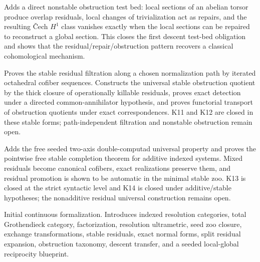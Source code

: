 \documentclass[11pt]{article}
\theoremstyle{definition}
\theoremstyle{remark}
\begin{document}
\begin{description}[leftmargin=8em,style=nextline]
\item[v0.4.0] Adds a direct nonstable obstruction test bed: local sections of an abelian torsor produce overlap residuals, local changes of trivialization act as repairs, and the resulting \v{C}ech $H^1$ class vanishes exactly when the local sections can be repaired to reconstruct a global section. This closes the first descent test-bed obligation and shows that the residual/repair/obstruction pattern recovers a classical cohomological mechanism.
\item[v0.3.0] Proves the stable residual filtration along a chosen normalization path by iterated octahedral cofiber sequences. Constructs the universal stable obstruction quotient by the thick closure of operationally killable residuals, proves exact detection under a directed common-annihilator hypothesis, and proves functorial transport of obstruction quotients under exact correspondences. K11 and K12 are closed in these stable forms; path-independent filtration and nonstable obstruction remain open.
\item[v0.2.0] Adds the free seeded two-axis double-computad universal property and proves the pointwise free stable completion theorem for additive indexed systems. Mixed residuals become canonical cofibers, exact realizations preserve them, and residual promotion is shown to be automatic in the minimal stable zoo. K13 is closed at the strict syntactic level and K14 is closed under additive/stable hypotheses; the nonadditive residual universal construction remains open.
\item[v0.1.0] Initial continuous formalization. Introduces indexed resolution categories, total Grothendieck category, factorization, resolution ultrametric, seed zoo closure, exchange transformations, stable residuals, exact normal forms, split residual expansion, obstruction taxonomy, descent transfer, and a seeded local-global reciprocity blueprint.
\end{description}
\endgroup
\end{document}
